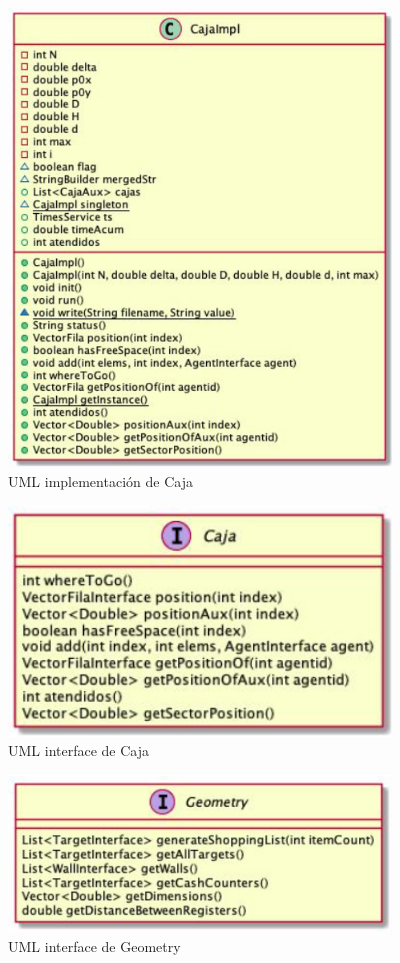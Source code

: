 \documentclass{article}
\begin{document}
\begin{figure}[h]
\begin{center}
\includegraphics[width=4in]{./images/claseCajaImpl.PNG}
\caption{UML implementación de Caja }
\label{cajaImpl}
\end{center}
\end{figure}

\begin{figure}[h]
\begin{center}
\includegraphics[width=4in]{./images/interfaceCaja.PNG}
\caption{UML interface de Caja }
\label{interfaceCaja}
\end{center}
\end{figure}

\begin{figure}[h]
\begin{center}
\includegraphics[width=4in]{./images/interfaceGeometry.PNG}
\caption{UML interface de Geometry }
\label{interfaceGeomety}
\end{center}
\end{figure}
\end{document}
